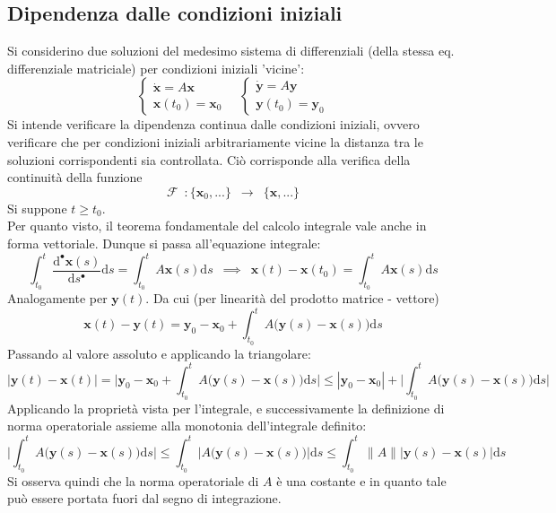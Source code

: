 \documentclass[10pt]{article}
\theoremstyle{plain}
\begin{document}
\subsection{Dipendenza dalle condizioni iniziali}
Si considerino due soluzioni del medesimo sistema di differenziali (della stessa eq. differenziale matriciale) per condizioni iniziali 'vicine':
\[\begin{cases}
\dot{\mathbf{x}} = A \mathbf{x}\\
\mathbf{x}(t_0) = \mathbf{x}_0
\end{cases} \quad \begin{cases}
\dot{\mathbf{y}} = A \mathbf{y}\\
\mathbf{y}(t_0) = \mathbf{y}_0
\end{cases}\]
Si intende verificare la dipendenza continua dalle condizioni iniziali, ovvero verificare che per condizioni iniziali arbitrariamente vicine la distanza tra le soluzioni corrispondenti sia controllata. Ciò corrisponde alla verifica della continuità della funzione
\[\mathcal{F} \enspace : \{\mathbf{x}_0, ...\} \enspace \rightarrow \enspace \{\mathbf{x}, ...\}\]
Si suppone $t \geq t_0$.
\\Per quanto visto, il teorema fondamentale del calcolo integrale vale anche in forma vettoriale. Dunque si passa all'equazione integrale:
\[\int_{t_0}^{t}\frac{\textrm{d}^{•} \mathbf{x}(s)}{\textrm{d}s^{•}}\textrm{d}s = \int_{t_0}^{t}A \mathbf{x}(s)\textrm{d}s \enspace \implies \enspace \mathbf{x}(t) - \mathbf{x}(t_0) = \int_{t_0}^{t}A \mathbf{x}(s)\textrm{d}s\]
Analogamente per $\mathbf{y}(t)$. Da cui (per linearità del prodotto matrice - vettore)
\[\mathbf{x}(t) - \mathbf{y}(t) = \mathbf{y}_0 - \mathbf{x}_0 + \int_{t_0}^{t}A \big( \mathbf{y}(s) - \mathbf{x}(s)\big)\textrm{d}s\]
Passando al valore assoluto e applicando la triangolare:
\[|\mathbf{y}(t) - \mathbf{x}(t)| = \bigg|\mathbf{y}_0 - \mathbf{x}_0 + \int_{t_0}^{t}A \big( \mathbf{y}(s) - \mathbf{x}(s)\big)\textrm{d}s\bigg| \leq | \mathbf{y}_0 - \mathbf{x}_0 | + \bigg|\int_{t_0}^{t}A \big( \mathbf{y}(s) - \mathbf{x}(s)\big)\textrm{d}s \bigg|\]
Applicando la proprietà vista per l'integrale, e successivamente la definizione di norma operatoriale assieme alla monotonia dell'integrale definito:
\[\bigg|\int_{t_0}^{t}A \big( \mathbf{y}(s) - \mathbf{x}(s)\big)\textrm{d}s \bigg| \leq \int_{t_0}^{t} \big| A \big( \mathbf{y}(s) - \mathbf{x}(s)\big)\big|\textrm{d}s \leq \int_{t_0}^{t} \| A \| \big| \mathbf{y}(s) - \mathbf{x}(s)\big| \textrm{d}s\]
Si osserva quindi che la norma operatoriale di $A$ è una costante e in quanto tale può essere portata fuori dal segno di integrazione.
\end{document}
